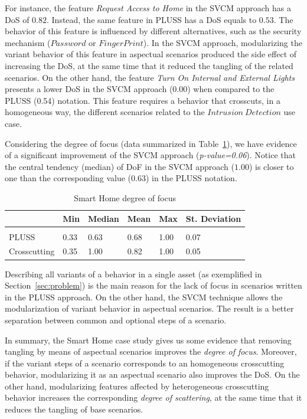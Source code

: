 \documentclass{acm_proc_article-sp}
\begin{document}
For instance, the feature \emph{Request Access to Home} in the SVCM
approach has a DoS of $0.82$. Instead, the same feature in PLUSS has a
DoS equals to $0.53$. The behavior of this feature is influenced by different
alternatives, such as the security mechanism ($Password$ or $Finger Print$).
In the SVCM approach, modularizing the variant behavior of this feature in
aspectual scenarios produced the side effect of increasing the DoS, at the same time that it reduced the tangling of the related scenarios.
On the other hand, the feature \emph{Turn On Internal and External Lights}
presents a lower DoS in the SVCM approach (0.00) when compared to the
PLUSS (0.54) notation. This feature requires a behavior that crosscuts, in a
homogeneous way, the different scenarios related to the $Intrusion\ Detection$
use case.

Considering the degree of focus (data summarized in Table~\ref{tab:sh-dof}), we
have evidence of a significant improvement of the SVCM approach
(\emph{p-value=0.06}). Notice that the central tendency (median) of DoF in the
SVCM approach ($1.00$) is closer to one than the corresponding value
($0.63$) in the PLUSS notation.

\begin{table}[htb] \centering
\caption{Smart Home degree of focus}
\label{tab:sh-dof}
\begin{small}
\begin{tabular}{llllll} \hline
					& Min 	& Median 	& Mean 	& Max 	& St. Deviation \\ \hline \\
	PLUSS			& 0.33  & 0.63   	& 0.68  & 1.00 	& 0.07 			\\
	Crosscutting	& 0.35  & 1.00   	& 0.82 	& 1.00 	& 0.05			\\ \hline	
\end{tabular}
\end{small}
\end{table}

Describing all variants of a behavior in a single asset
(as exemplified in Section~\ref{sec:problem}) is the main reason for the lack of
focus in scenarios written in the PLUSS approach. On the other hand, the SVCM technique
allows the modularization of variant behavior in aspectual scenarios. The result
is a better separation between common and optional steps of a scenario.

In summary, the Smart Home case study gives us some evidence that removing tangling by
means of aspectual scenarios improves the \emph{degree of focus}. Moreover, if
the variant steps of a scenario corresponds to an homogeneous crosscutting
behavior, modularizing it as an aspectual scenario also improves the DoS. On the
other hand, modularizing features affected by heterogeneous crosscutting
behavior increases the corresponding \emph{degree of scattering}, at the same time that it reduces the tangling of base scenarios.
\end{document}
